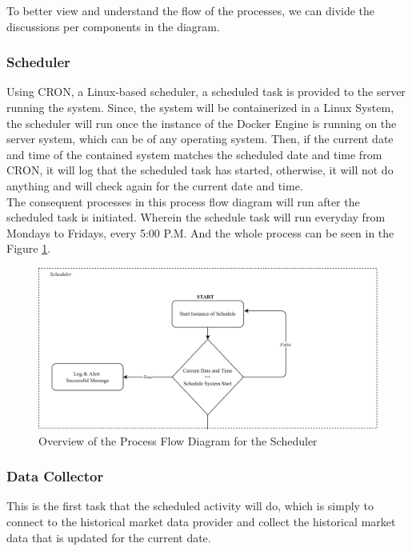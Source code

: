 To better view and understand the flow of the processes, 
we can divide the discussions per components in the diagram.

\subsubsection{Scheduler}
\label{subsubsc:scheduler}
Using CRON, a Linux-based scheduler, a 
scheduled task is provided to the server running the system. Since, 
the system will be containerized in a Linux System, the scheduler will 
run once the instance of the Docker Engine is running on the server system, 
which can be of any operating system. Then, if the current date and time of 
the contained system matches the scheduled date and time from CRON, it will 
log that the scheduled task has started, otherwise, it will not do anything 
and will check again for the current date and time.
\hfill \\

The consequent processes in this process flow diagram will run after the 
scheduled task is initiated. Wherein the schedule task will run everyday from 
Mondays to Fridays, every 5:00 P.M. And the whole process can be seen in the 
Figure \ref{fig:process_flowchart_scheduler}.
\begin{figure}[ht]
    \centering
    \includegraphics[width=1\textwidth]{./assets/Chapter_3/PFC/ProcessFlowchart_Scheduler.png}
    \caption{Overview of the Process Flow Diagram for the Scheduler}
    \label{fig:process_flowchart_scheduler}
\end{figure}
\FloatBarrier

\subsubsection{Data Collector}
\label{subsubsec:data_ollector}
This is the first task that the scheduled 
activity will do, which is simply to connect to the historical market 
data provider and collect the historical market data that is updated for 
the current date.
\hfill \\

